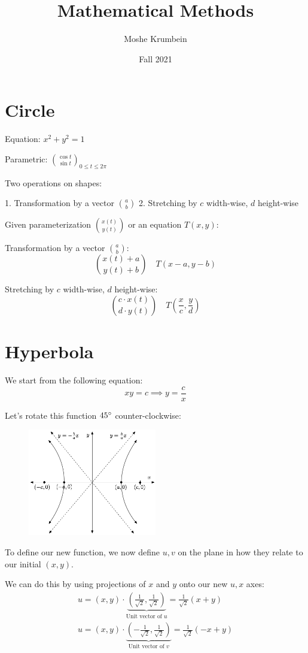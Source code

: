 \documentclass[00_complete]{subfiles}
\title{Mathematical Methods}
\author{Moshe Krumbein}
\date{Fall 2021}
\begin{document}

\section{Circle}

Equation: $x^2+y^2=1$

Parametric: $\binom{\cos t}{\sin t}_{0 \leq t \leq 2 \pi}$

Two operations on shapes:

1. Transformation by a vector $\binom{a}{b}$
2. Stretching by $c$ width-wise, $d$ height-wise

Given parameterization $\binom{x(t)}{y(t)}$ or an equation $T(x,y)$:

Transformation by a vector $\binom{a}{b}$:
$$\binom{x(t) + a}{y(t) + b} \quad T(x-a, y-b)$$

Stretching by $c$ width-wise, $d$ height-wise:
$$\binom{c \cdot x(t)}{d \cdot y(t)} \quad T\left(\frac{x}{c}, \frac{y}{d}\right)$$

\section{Hyperbola}
We start from the following equation:
$$xy=c \implies y=\frac{c}{x}$$

Let's rotate this function $45 \degree$ counter-clockwise:

\begin{figure}[ht]
    \centering
      \includegraphics[width=0.5\textwidth]{hyperbola}
\end{figure}

To define our new function, we now define ${u,v}$ on the plane in how they
relate to our initial $(x,y)$.

We can do this by using projections of $x$ and $y$ onto our new $u, x$ axes:
$$
\begin{gathered}
    u = (x,y) \cdot \underbrace{\left( \frac{1}{\sqrt 2}, \frac{1}{\sqrt 2}\right)}_{\text{Unit vector of $u$}} = \frac{1}{\sqrt 2}( x+y) \\
    u = (x,y) \cdot \underbrace{\left(-\frac{1}{\sqrt 2}, \frac{1}{\sqrt 2}\right)}_{\text{Unit vector of $v$}} = \frac{1}{\sqrt 2}(-x+y)
\end{gathered}
$$
\end{document}
